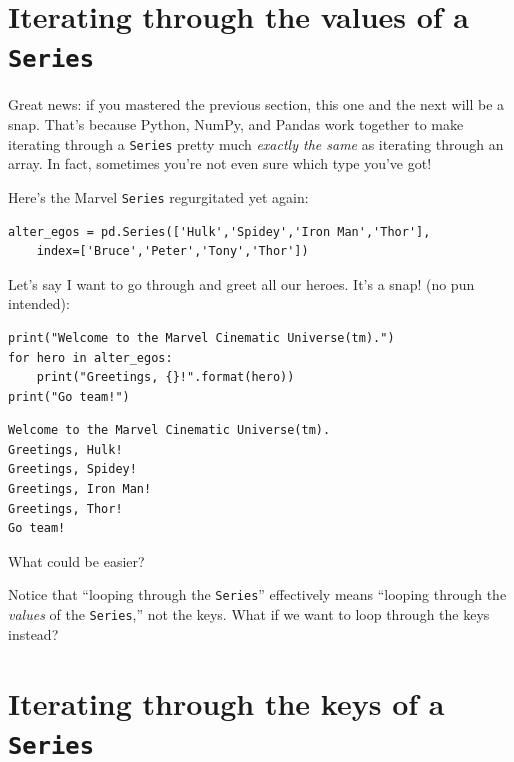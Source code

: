 \section{Iterating through the values of a \texttt{Series}}

\label{seriesLoops}

Great news: if you mastered the previous section, this one and the next will be
a snap. That's because Python, NumPy, and Pandas work together to make
iterating through a \texttt{Series} pretty much \textit{exactly the same} as
iterating through an array. In fact, sometimes you're not even sure which type
you've got!


\pagebreak
Here's the Marvel \texttt{Series} regurgitated yet again:

\begin{Verbatim}[fontsize=\footnotesize,samepage=true,frame=single,framesep=3mm]
alter_egos = pd.Series(['Hulk','Spidey','Iron Man','Thor'],
    index=['Bruce','Peter','Tony','Thor'])
\end{Verbatim}


Let's say I want to go through and greet all our heroes. It's a snap! (no pun
intended):

\begin{Verbatim}[fontsize=\small,samepage=true,frame=single,framesep=3mm]
print("Welcome to the Marvel Cinematic Universe(tm).")
for hero in alter_egos:
    print("Greetings, {}!".format(hero))
print("Go team!")
\end{Verbatim}

\begin{Verbatim}[fontsize=\small,samepage=true,frame=leftline,framesep=5mm,framerule=1mm]
Welcome to the Marvel Cinematic Universe(tm).
Greetings, Hulk!
Greetings, Spidey!
Greetings, Iron Man!
Greetings, Thor!
Go team!
\end{Verbatim}

What could be easier?

Notice that ``looping through the \texttt{Series}'' effectively means ``looping
through the \textit{values} of the \texttt{Series},'' not the keys. What if we
want to loop through the keys instead?

\section[\small Iterating through keys of a \texttt{Series}]{Iterating through the keys of a \texttt{Series}}

